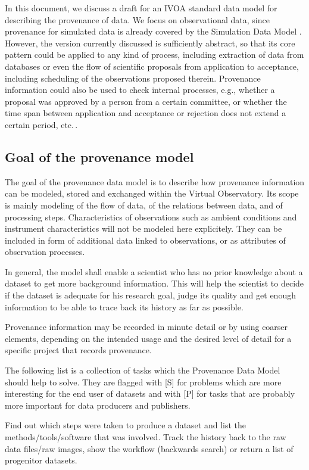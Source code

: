 In this document, we discuss a draft for an IVOA standard data model for
describing the provenance of data. We focus on observational data, since
provenance for simulated data is already covered by the Simulation Data Model
\citep[SimDM][]{std:SimDM}. However, the version currently discussed is
sufficiently abstract, so that its core pattern could be applied to any kind
of process, including extraction of data from 
databases or even the flow of scientific proposals from application to 
acceptance, including scheduling of the observations proposed therein.
Provenance information could also be used to check internal processes,
e.g., whether a proposal was approved by a person from a certain committee,
or whether the time span between application and acceptance or rejection
does not extend a certain period, etc.\,. 


\subsection{Goal of the provenance model}\label{sec:goals}
The goal of the provenance data model is to describe how provenance information
can be modeled, stored and exchanged within the Virtual Observatory. Its scope
is mainly modeling of the flow of data, of the relations between data,
and of processing steps. Characteristics of observations such as ambient
conditions and instrument characteristics will not be modeled here
explicitely. They can be included in form of additional data linked to
observations, or as attributes of observation processes.

In general, the model shall enable a scientist who has no prior knowledge about
a dataset to get more 
background information. This will help the scientist to decide if the dataset 
is adequate for his research goal, judge its quality and get enough information
to be able to trace back its history as far as possible. 

Provenance information may be recorded in minute detail or by using coarser
elements, depending on the intended usage and the desired level of detail
for a specific project that records provenance.

The following list is a collection of tasks which the Provenance Data Model should help to solve. They are flagged with [S] for problems which are more interesting for the end user of datasets and with [P] for tasks that are probably more important for data producers and publishers.

        Find out which steps were taken to produce a dataset and list the methods/tools/software that was involved. 
        Track the history back to the raw data files/raw images, show the workflow (backwards search) or return a list of progenitor datasets.

